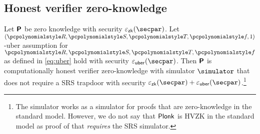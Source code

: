 \documentclass[runningheads,11pt]{llncs}
\begin{document}
\subsection{Honest verifier zero-knowledge}
\begin{lemma}
  \label{lem:plonk_hvzk}
  Let $\bm{\mathsf{P}}$ be zero knowledge with security $\epszk(\secpar)$. Let
  $(\pR, \pS, \pT, \pf, 1)$-uber assumption for $\pR, \pS, \pT, \pf$ as defined
  in \cref{eq:uber} hold with security $\epsuber(\secpar)$. Then $\bm{\mathsf{P}}$ is
  computationally honest verifier zero-knowledge with simulator $\simulator$
  that does not require a SRS trapdoor with security
  $\epszk(\secpar) + \epsuber(\secpar)$.\footnote{The simulator works as a simulator for proofs
    that are zero-knowledge in the standard model. However, we do not say that
    $\textnormal{\textsf{Plonk}}$ is HVZK in the standard model as proof of that \emph{requires} the
    SRS simulator.}
\end{lemma}
\end{document}

